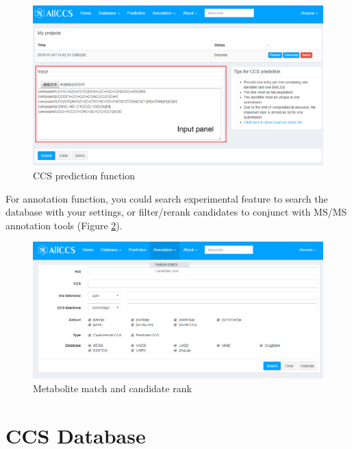 \documentclass[12pt,]{book}
\theoremstyle{definition}
\theoremstyle{definition}
\theoremstyle{definition}
\theoremstyle{remark}
\begin{document}
\begin{figure}

{\centering \includegraphics{images/chapter1/prediction} 

}

\caption{CCS prediction function}\label{fig:FigPrediction}
\end{figure}

For annotation function, you could search experimental feature to search
the database with your settings, or filter/rerank candidates to conjunct
with MS/MS annotation tools (Figure \ref{fig:FigMatch}).

\begin{figure}

{\centering \includegraphics{images/chapter1/match} 

}

\caption{Metabolite match and candidate rank}\label{fig:FigMatch}
\end{figure}

\chapter{CCS Database}\label{chapter2}
\end{document}
